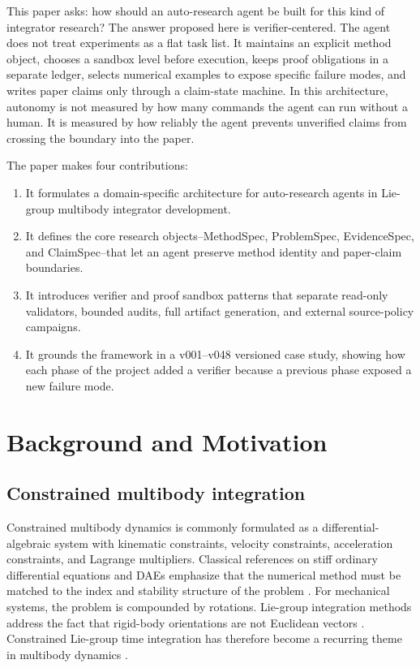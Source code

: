 \documentclass[10pt]{article}
\begin{document}
This paper asks: how should an auto-research agent be built for this kind of
integrator research? The answer proposed here is verifier-centered. The agent
does not treat experiments as a flat task list. It maintains an explicit
method object, chooses a sandbox level before execution, keeps proof
obligations in a separate ledger, selects numerical examples to expose
specific failure modes, and writes paper claims only through a claim-state
machine. In this architecture, autonomy is not measured by how many commands
the agent can run without a human. It is measured by how reliably the agent
prevents unverified claims from crossing the boundary into the paper.

The paper makes four contributions:
\begin{enumerate}
  \item It formulates a domain-specific architecture for auto-research agents
  in Lie-group multibody integrator development.
  \item It defines the core research objects--MethodSpec, ProblemSpec,
  EvidenceSpec, and ClaimSpec--that let an agent preserve method identity and
  paper-claim boundaries.
  \item It introduces verifier and proof sandbox patterns that separate
  read-only validators, bounded audits, full artifact generation, and
  external source-policy campaigns.
  \item It grounds the framework in a v001--v048 versioned case study,
  showing how each phase of the project added a verifier because a previous
  phase exposed a new failure mode.
\end{enumerate}

\section{Background and Motivation}

\subsection{Constrained multibody integration}

Constrained multibody dynamics is commonly formulated as a differential-
algebraic system with kinematic constraints, velocity constraints, acceleration
constraints, and Lagrange multipliers. Classical references on stiff ordinary
differential equations and DAEs emphasize that the numerical method must be
matched to the index and stability structure of the problem
\cite{hairer1996solving,gear1985automatic}. For mechanical systems, the
problem is compounded by rotations. Lie-group integration methods address the
fact that rigid-body orientations are not Euclidean vectors
\cite{munthe1998lie,munthe1999high}. Constrained Lie-group time integration
has therefore become a recurring theme in multibody dynamics
\cite{bruls2012lie,wieloch2021bdf}.
\end{document}
